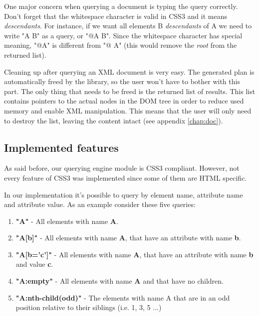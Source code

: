 \documentclass[a4paper]{report}
\begin{document}
	One major concern when querying a document is typing the query correctly. Don't forget that the whitespace character is valid in CSS3 and it means \emph{descendants}. For instance, if we want all elements B \emph{descendants} of A we need to write "A B" as a query, or "@A B". Since the whitespace character has special meaning, "@A" is different from "@ A" (this would remove the \emph{root} from the returned list).

	Cleaning up after querying an XML document is very easy. The generated plan is automatically freed by the library, so the user won't have to bother with this part. The only thing that needs to be freed is the returned list of	results. This list contains pointers to the actual nodes in the DOM tree in order to reduce used memory and enable XML manipulation. This means that the user will only need to destroy the list, leaving the content intact (see appendix \ref{chap:doc}).

	\subsection{Implemented features}
		As said before, our querying engine module is CSS3 compliant. However, not every feature of CSS3 was implemented since some of them are HTML specific.

		In our implementation it's possible to query by element name, attribute name and attribute value. As an example consider these five queries:

			\begin{enumerate}
				\item \textbf{"A"} - All elements with name \textbf{A}.\\
				\item \textbf{"A[b]"} - All elements with name \textbf{A}, that have an attribute with name \textbf{b}.\\
				\item \textbf{"A[b='c']"} - All elements with name \textbf{A}, that have an attribute with name \textbf{b} and value \textbf{c}.\\
				\item \textbf{"A:empty"} - All elements with name \textbf{A} and that have no children.\\
				\item \textbf{"A:nth-child(odd)"} - The elements with name A that are in an odd position relative to their siblings (i.e. 1, 3, 5 ...)\
			\end{enumerate}
\end{document}
